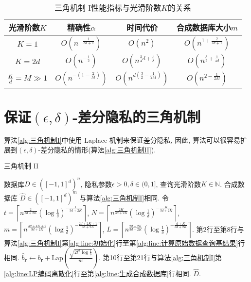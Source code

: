 \begin{table}[hbtp]\centering
  \caption{三角机制 I性能指标与光滑阶数$K$的关系}\label{tab:算法性能指标与光滑阶数关系}
  \begin{tabular}{c|ccc}
    \hline
    光滑阶数$K$ & 精确性$\alpha$ & 时间代价 & 合成数据库大小$m$ \\
    \hline
    $K=1$ & $O\left(n^{-\frac{1}{2d+1}}\right)$ & $O(n^2)$
    & $O\left(n^{1+\frac{2}{2d+1}}\right)$ \\
    $K=2d$ & $O\left(n^{-\frac{1}{2}}\right)$ & $O\left(n^{\frac{3}{4}d+\frac{5}{8}}\right)$ & $O\left(n^{\frac{3}{2}+\frac{1}{4d}}\right)$ \\
    $\frac{K}{d}=M \gg 1$ & $O\left(n^{-(1-\frac{2}{M})}\right)$ & $O\left(n^{d(\frac{3}{2}-\frac{1}{2M})}\right)$ & $O\left(n^{2-\frac{1}{2M}}\right)$ \\
    \hline
  \end{tabular}
\end{table}
\renewcommand{\arraystretch}{1}
\section{保证\texorpdfstring{$(\epsilon, \delta)$}{(ϵ, δ)}-差分隐私的三角机制} %
\label{sec:_epsilon_delta_差分隐私机制}
算法\ref{alg:三角机制I}中使用 Laplace 机制来保证差分隐私, 因此, 算法可以很容易扩展到$(\epsilon, \delta)$-差分隐私的情形(算法\ref{alg:三角机制II}). 
\begin{algorithm}[hbtp]
\caption{三角机制 II}\label{alg:三角机制II}
\begin{algorithmic}[1]
  \REQUIRE 数据库$D \in \left([-1,1]^d \right)^n$, 隐私参数$\epsilon > 0, \delta\in(0, 1]$, 查询光滑阶数$K\in\mathbb{N}$.
  \ENSURE 合成数据库 $\hat{D} \in \left([-1,1]^d \right)^m$
  \NOTATION 与算法\ref{alg:三角机制I}相同. 
  \STATE 令 $t = \left\lceil n^{\frac{2}{3d+2K}}\left(\log\frac{1}{\delta}\right) ^{-\frac{1}{3d+2K}} \right\rceil$,
   $N = \left\lceil n^{\frac{2K}{3d+2K}}\left(\log\frac{1}{\delta}\right) ^{-\frac{K}{3d+2K}}\right\rceil$, \\ 
   $m = \left\lceil n^{\frac{4d+4K+2}{3d+2K}}\left(\log\frac{1}{\delta}\right) ^{-\frac{2d+2K+1}{3d+2K}}\right\rceil$,
   $L=\left\lceil n^{\frac{2d+2K}{3d+2K}}\left(\log\frac{1}{\delta}\right) ^{-\frac{d+K}{3d+2K}}\right\rceil$. \label{alg:line:三角机制II参数设定}
  \STATE 第2行至第8行与算法\ref{alg:三角机制I}第\ref{alg:line:初始化}行至第\ref{alg:line:计算原始数据查询基结果}行相同.
    \STATE $\hat{b}_{\mathbf{r}} \leftarrow b_{\mathbf{r}} + \mathrm{Lap}\left(\frac{\sqrt{2t^d\log\frac{1}{\delta}}}{n \epsilon}\right)$. 
    \STATE 第10行至第21行与算法\ref{alg:三角机制I}第\ref{alg:line:LP编码离散化}行至第\ref{alg:line:生成合成数据库}行相同.
  \RETURN $\hat{D}$.
\end{algorithmic}
\end{algorithm}

